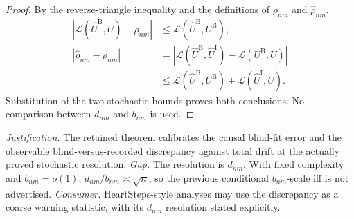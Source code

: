 \documentclass{article}
\begin{document}
\begin{proof}
By the reverse-triangle inequality and the definitions of \(\rho_{nm}\) and \(\widehat\rho_{nm}\),
\[
 \begin{aligned}
 \left|\mathcal L(\widehat U^{\mathrm B},U)-\rho_{nm}\right|
 &\le\mathcal L(\widehat U^{\mathrm B},U^{\mathrm B}),\\
 |\widehat\rho_{nm}-\rho_{nm}|
 &=\left|\mathcal L(\widehat U^{\mathrm B},\widehat U^{\mathrm I})
 -\mathcal L(U^{\mathrm B},U)\right|\\
 &\le\mathcal L(\widehat U^{\mathrm B},U^{\mathrm B})
 +\mathcal L(\widehat U^{\mathrm I},U).
 \end{aligned}
\]
Substitution of the two stochastic bounds proves both conclusions.  No comparison between \(d_{nm}\) and \(b_{nm}\) is used.
\end{proof}
\par\smallskip\noindent \textit{Justification.} The retained theorem calibrates the causal blind-fit error and the observable blind-versus-recorded discrepancy against total drift at the actually proved stochastic resolution. \textit{Gap.} The resolution is \(d_{nm}\).  With fixed complexity and \(b_{nm}=o(1)\), \(d_{nm}/b_{nm}\asymp\sqrt n\), so the previous conditional \(b_{nm}\)-scale iff is not advertised. \textit{Consumer.} HeartSteps-style analyses may use the discrepancy as a coarse warning statistic, with its \(d_{nm}\) resolution stated explicitly.
\end{document}
